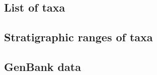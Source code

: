 \documentclass[a4paper, 12pt]{article}
\begin{document}
\newpage
\begin{landscape}
\subsection{List of taxa}

\end{landscape}

\newpage


\newpage
\begin{landscape}
\subsection{Stratigraphic ranges of taxa}

\end{landscape}

\subsection{GenBank data}


\newpage
\end{document}
